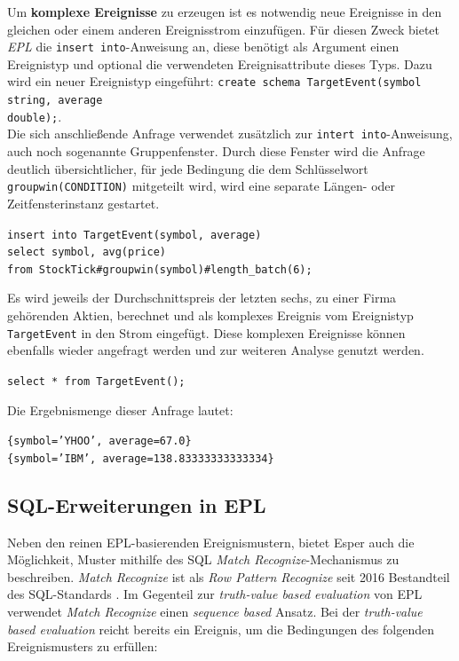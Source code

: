 \documentclass{acm_proc_article-sp}
\begin{document}
Um \textbf{komplexe Ereignisse} zu erzeugen ist es notwendig neue Ereignisse in den 
gleichen oder einem anderen Ereignisstrom einzufügen. Für diesen Zweck bietet 
\textit{EPL} die 
\texttt{insert into}-Anweisung an, diese benötigt als Argument einen Ereignistyp und 
optional die verwendeten Ereignisattribute dieses Typs. Dazu wird ein neuer Ereignistyp 
eingeführt: \texttt{create schema TargetEvent(symbol string, average\\ double);}.\\
Die sich anschließende Anfrage verwendet zusätzlich zur \texttt{intert into}-Anweisung, 
auch noch sogenannte Gruppenfenster. Durch diese Fenster wird die Anfrage deutlich 
übersichtlicher, für jede Bedingung die dem Schlüsselwort \texttt{groupwin(CONDITION)} 
mitgeteilt wird, wird eine separate Längen- oder Zeitfensterinstanz gestartet.

\texttt{insert into TargetEvent(symbol, average)\\
select symbol, avg(price)\\
from StockTick\#groupwin(symbol)\#length\_batch(6);}

Es wird jeweils der Durchschnittspreis der letzten sechs, zu einer Firma gehörenden 
Aktien, berechnet und als komplexes Ereignis vom Ereignistyp \texttt{TargetEvent} in den 
Strom eingefügt. Diese komplexen Ereignisse können ebenfalls wieder angefragt werden und 
zur weiteren Analyse genutzt werden.

\texttt{select  * from TargetEvent();} 

Die Ergebnismenge dieser Anfrage lautet:

\texttt{\{symbol='YHOO', average=67.0\}}\\
\texttt{\{symbol='IBM', average=138.83333333333334\}}

\subsection{SQL-Erweiterungen in EPL}\label{sql}

Neben den reinen EPL-basierenden Ereignismustern, bietet Esper auch die Möglichkeit, 
Muster mithilfe des SQL \emph{Match Recognize}-Mechanismus zu beschreiben. \emph{Match 
Recognize} ist als \emph{Row Pattern Recognize} seit 2016 Bestandteil des SQL-Standards 
\cite{sql-2016}. Im Gegenteil zur \emph{truth-value based evaluation} von EPL verwendet 
\emph{Match Recognize} einen \emph{sequence based} Ansatz. Bei der \emph{truth-value 
based evaluation} reicht bereits ein Ereignis, um die Bedingungen des 
folgenden Ereignismusters zu erfüllen:
\end{document}
